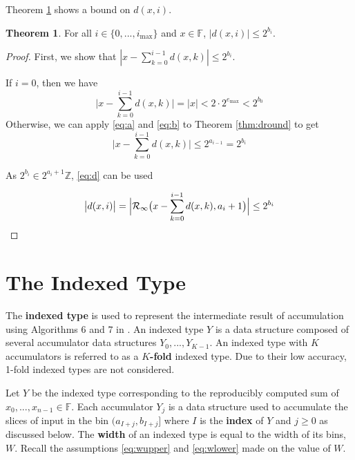 \documentclass[12pt]{article}
\providecommand{\F}{\ensuremath{\mathbb{F}}}
\providecommand{\Z}{\ensuremath{\mathbb{Z}}}
\providecommand{\max}{\ensuremath{\text{max}}}
\providecommand{\roundtonearestinfty}{\ensuremath{\mathcal{R}_\text{$\infty$}}}
\theoremstyle{definition}
\newtheorem{thm}{Theorem}[section]
\numberwithin{equation}{section}
\numberwithin{figure}{section}
\begin{document}
    Theorem \ref{thm:dbound} shows a bound on $d(x, i)$.

    \begin{samepage}
    \begin{thm}
      For all $i \in \{0, ..., i_{\max}\}$ and $x \in \F$, $|d(x, i)| \leq 2^{b_i}$.
      \label{thm:dbound}
    \end{thm}
    \end{samepage}

    \begin{proof}
      First, we show that $|x - \sum\limits_{k=0}^{i - 1}d(x,k)| \leq 2^{b_i}$.

      If $i = 0$, then we have
      \begin{equation*}
        \bigl|x - \sum\limits_{k=0}^{i - 1}d(x,k)\bigr| = |x| < 2 \cdot 2^{e_{\max}} < 2^{b_0}
      \end{equation*}
      Otherwise, we can apply  \eqref{eq:a} and \eqref{eq:b} to Theorem \ref{thm:dround} to get
      \begin{equation*}
        \bigl|x - \sum \limits_{k = 0}^{i - 1}d(x, k)\bigr| \leq 2^{a_{i - 1}} = 2^{b_i}
      \end{equation*}

      As $2^{b_i} \in 2^{a_i + 1}\Z$,  \eqref{eq:d} can be used

      \begin{equation*}
        \bigl|d(x, i)\bigr| = \Bigl|\roundtonearestinfty\bigl(x - \sum\limits_{k=0}^{i - 1}d(x,k), a_i + 1\bigr)\Bigr| \leq 2^{b_i}
      \end{equation*}
    \end{proof}

\section{The Indexed Type}
  \label{sec:indexed}
    The \textbf{indexed type} is used to represent the intermediate result of accumulation using Algorithms 6 and $7$ in \cite{repsum}.
    An indexed type $Y$ is a data structure composed of several accumulator data structures $Y_0, ..., Y_{K - 1}$. An indexed type with $K$ accumulators is referred to as a \textbf{$K$-fold} indexed type. Due to their low accuracy, 1-fold indexed types are not considered.

    Let $Y$ be the indexed type corresponding to the reproducibly computed sum of $x_0, ..., x_{n - 1} \in \F$.
    Each accumulator $Y_j$ is a data structure used to accumulate the slices of input in the bin $(a_{I + j}, b_{I + j}]$ where $I$ is the \textbf{index} of $Y$ and $j \geq 0$ as discussed below. The \textbf{width} of an indexed type is equal to the width of its bins, $W$. Recall the assumptions \eqref{eq:wupper} and \eqref{eq:wlower} made on the value of $W$.
\end{document}
